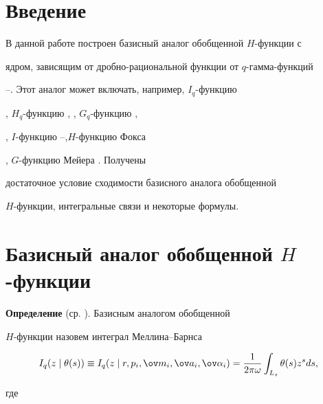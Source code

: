 \maketitle  


\label{begin}  


  


\section{Введение} 


 


В данной работе построен базисный аналог обобщенной $H$-функции с 


ядром, зависящим от дробно-рациональной функции от $q$-гамма-функций 


\cite{1}--\cite{6}. Этот аналог может включать, например, $I_q$-функцию 


\cite{7}, $H_q$-функцию \cite{8}, \cite{9}, $G_q$-функцию \cite{8}, 


\cite{10}, $I$-функцию \cite{11}--\cite{13},\linebreak $H$-функцию Фокса 


\cite{14}, $G$-функцию Мейера \cite{15}. Получены 


достаточное условие сходимости базисного аналога обобщенной 


$H$-функции, интегральные связи и некоторые формулы. 


 


\section{Базисный аналог обобщенной $H$-функции} 


 


{\bf Определение} (ср. \cite{7}). Базисным аналогом обобщенной 


$H$-функции назовем интеграл Мел\-ли\-на--Барнса 


\begin{equation} 


I_q(z\mid\theta(s))\equiv I_q(z\mid r,p_i,\ov m_i,\ov a_i,\ov\alpha_i)= 


\frac{1}{2\pi \omega}\int_{L_s}\theta(s)z^s ds, 


\end{equation} 


где 


